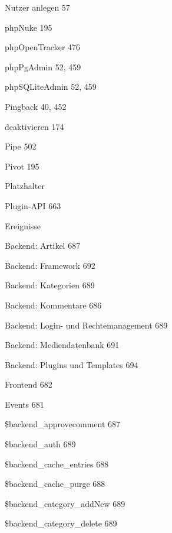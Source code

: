\documentclass{book}
\renewcommand\subitem{\par}
\renewcommand\subsubitem{\par\hspace*{3mm}}
\begin{document}
\begin{multicols}{2}
\begin{osp-index}
    \subitem Nutzer anlegen\hspace{1mm} 57
  \item phpNuke\hspace{1mm} 195
  \item phpOpenTracker\hspace{1mm} 476
  \item phpPgAdmin\hspace{1mm} 52, 459
  \item phpSQLiteAdmin\hspace{1mm} 52, 459
  \item Pingback\hspace{1mm} 40, 452
    \subitem deaktivieren\hspace{1mm} 174
  \item Pipe\hspace{1mm} 502
  \item Pivot\hspace{1mm} 195
  \item Platzhalter\hspace{1mm} 
  \item Plugin-API\hspace{1mm} 663
    \subitem Ereignisse
      \subsubitem Backend: Artikel\hspace{1mm} 687
      \subsubitem Backend: Framework\hspace{1mm} 692
      \subsubitem Backend: Kategorien\hspace{1mm} 689
      \subsubitem Backend: Kommentare\hspace{1mm} 686
      \subsubitem Backend: Login- und Rechtemanagement\hspace{1mm} 689
      \subsubitem Backend: Mediendatenbank\hspace{1mm} 691
      \subsubitem Backend: Plugins und Templates\hspace{1mm} 694
      \subsubitem Frontend\hspace{1mm} 682
    \subitem Events\hspace{1mm} 681
      \subsubitem \$backend\_approvecomment\hspace{1mm} 687
      \subsubitem \$backend\_auth\hspace{1mm} 689
      \subsubitem \$backend\_cache\_entries\hspace{1mm} 688
      \subsubitem \$backend\_cache\_purge\hspace{1mm} 688
      \subsubitem \$backend\_category\_addNew\hspace{1mm} 689
      \subsubitem \$backend\_category\_delete\hspace{1mm} 689

\end{osp-index}
\end{multicols}
\end{document}

